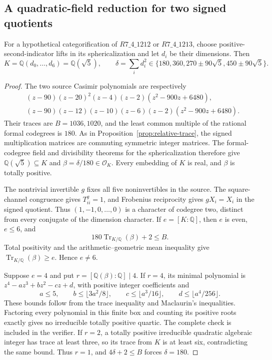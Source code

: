 \subsection{A quadratic-field reduction for two signed quotients}
\label{subsec:quadratic-signed-reduction}

\begin{proposition}\label{prop:quadratic-signed-reduction}
For a hypothetical categorification of $R7\_4\_1212$ or
$R7\_4\_1213$, choose positive-second-indicator lifts in its
sphericalization and let $d_i$ be their dimensions. Then
\[
 K=\mathbb Q(d_0,\ldots,d_6)=\mathbb Q(\sqrt5),\qquad
 \delta=\sum_i d_i^2\in
 \{180,360,270\pm90\sqrt5,450\pm90\sqrt5\}.
\]
\end{proposition}
\begin{proof}
The two source Casimir polynomials are respectively
\[
\begin{split}
 &(z-90)(z-20)^2(z-4)(z-2)(z^2-900z+6480),\\
 &(z-90)(z-12)(z-10)(z-6)(z-2)(z^2-900z+6480).
\end{split}
\]
Their traces are $B=1036,1020$, and the least common multiple of
the rational formal codegrees is $180$. As in
Proposition~\ref{prop:relative-trace}, the signed multiplication
matrices are commuting symmetric integer matrices. The formal-codegree
field and divisibility theorems for the sphericalization
\cite[Theorem~2.13 and Corollaries~2.14--2.15]{OstrikRank3}
therefore give $\mathbb Q(\sqrt5)\subseteq K$ and
$\beta=\delta/180\in\mathcal O_K$. Every embedding of $K$ is real,
and $\beta$ is totally positive.

The nontrivial invertible $g$ fixes all five noninvertibles in the
source. The square-channel congruence gives $T_{ii}^g=1$, and
Frobenius reciprocity gives $gX_i=X_i$ in the signed quotient. Thus
$(1,-1,0,\ldots,0)$ is a character of codegree two, distinct from
every conjugate of the dimension character. If $e=[K:\mathbb Q]$,
then $e$ is even, $e\leq6$, and
\[
 180\operatorname{Tr}_{K/\mathbb Q}(\beta)+2\leq B.
\]
Total positivity and the arithmetic--geometric mean inequality give
$\operatorname{Tr}_{K/\mathbb Q}(\beta)\geq e$. Hence $e\ne6$.

Suppose $e=4$ and put $r=[\mathbb Q(\beta):\mathbb Q]\mid4$.
If $r=4$, its minimal polynomial is
$z^4-az^3+bz^2-cz+d$, with positive integer coefficients and
\[
 a\leq5,\qquad b\leq\lfloor3a^2/8\rfloor,\qquad
 c\leq\lfloor a^3/16\rfloor,\qquad
 d\leq\lfloor a^4/256\rfloor.
\]
These bounds follow from the trace inequality and Maclaurin's
inequalities. Factoring every polynomial in this finite box and
counting its positive roots exactly gives no irreducible totally
positive quartic. The complete check is included in the verifier.
If $r=2$, a totally positive irreducible quadratic algebraic integer
has trace at least three, so its trace from $K$ is at least six,
contradicting the same bound. Thus $r=1$, and
$4\delta+2\leq B$ forces $\delta=180$.


\end{proof}
